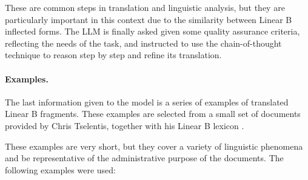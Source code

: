 These are common steps in translation and linguistic analysis, but they are particularly important in this context due to the similarity between Linear B inflected forms.
The LLM is finally asked given some quality assurance criteria, reflecting the needs of the task, and instructed to use the chain-of-thought technique to reason step by step and refine its translation.

\paragraph{Examples.}
The last information given to the model is a series of examples of translated Linear B fragments.
These examples are selected from a small set of documents provided by Chris Tselentis, together with his Linear B lexicon \cite{tselentis}.

These examples are very short, but they cover a variety of linguistic phenomena and be representative of the administrative purpose of the documents.
The following examples were used:

